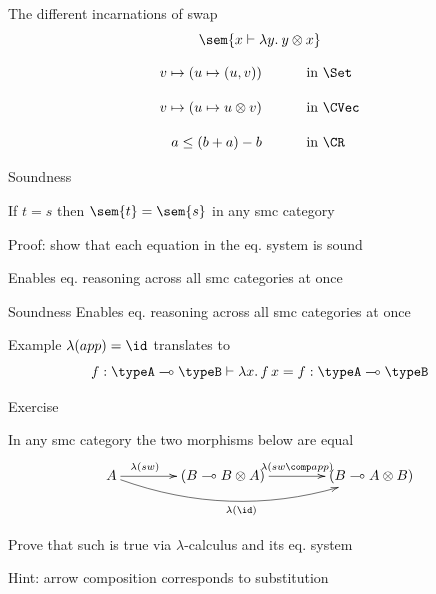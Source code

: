 \documentclass{beamer}
\begin{document}
\begin{frame}{The different incarnations of swap}
        \[
                \sem{x  \vdash \lambda y. \> y \otimes x }
        \]

        \begin{align*}
                v \mapsto (u \mapsto (u,v)) & \hspace{1cm} \text{ in } \Set 
                \\[10pt]
                v \mapsto (u \mapsto u \otimes v) & \hspace{1cm} \text{ in } \CVec
                \\[10pt]
                a \leq (b + a) - b & \hspace{1cm} \text{ in } \CR
        \end{align*}
\end{frame}

\begin{frame}{Soundness}

        If $t = s$ then $\sem{t} = \sem{s}$ in any smc category

        \medskip
        Proof: show that each equation in the eq. system is sound 

        \medskip
        Enables eq. reasoning across all smc categories at once
\end{frame}

\begin{frame}{Soundness}
        Enables eq. reasoning across all smc categories at once

        \medskip
        \begin{block}{Example}
                $\lambda(app) = \id$ translates to
                \[
                        f : \typeA \multimap \typeB \vdash \lambda x. \, f \, x = f : \typeA \multimap \typeB
                \]
        \end{block}
\end{frame}


\begin{frame}{Exercise}

        In any smc category the two morphisms below are equal
        \[
                \xymatrix@C=40pt{
                        A \ar[r]^(0.3){\lambda(sw)} 
                        \ar@/_1.5pc/[rr]_{\lambda(\id)} 
                        & (B \multimap B \otimes A)
                        \ar[r]^{\lambda(sw \comp app) } &
                        (B \multimap A \otimes B)
                }
        \]

        Prove that such is true via $\lambda$-calculus and its eq. system

        Hint: arrow composition corresponds to substitution
\end{frame}
\end{document}
